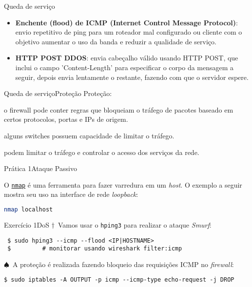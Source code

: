   \begin{frame}{Queda de serviço}
    \begin{itemize}[<+->]
    \item {\bf Enchente (flood) de ICMP (Internet Control Message
        Protocol)}: envio repetitivo de ping para um roteador mal
      configurado ou cliente com o objetivo aumentar o uso da banda e
      reduzir a qualidade de serviço.
    \item {\bf HTTP POST DDOS}: envia cabeçalho válido usando HTTP
      POST, que inclui o campo 'Content-Length' para especificar o
      corpo da mensagem a seguir, depois envia lentamente o restante,
      fazendo com que o servidor espere.
    \end{itemize}    
  \end{frame}

  \begin{frame}{Queda de serviço}{Proteção}
    Proteção:\\
    \begin{description}[<+->]
    \item[Firewall:] o firewall pode conter regras que bloqueiam o tráfego
      de pacotes baseado em certos protocolos, portas e IPs de origem.
    \item[Switch:] alguns switches possuem capacidade de limitar o tráfego.
    \item[Roteador:] podem limitar o tráfego e controlar o acesso dos
      serviços da rede.
    \end{description}
  \end{frame}

\begin{frame}[fragile]{Prática 1}{Ataque Passivo}
  
  O \href{https://nmap.org/}{\tt nmap} é uma ferramenta para fazer varredura em
  um {\it host\/}. O exemplo a seguir mostra seu uso na interface de rede
  {\it loopback\/}:
  
\begin{lstlisting}[language=bash]
nmap localhost
\end{lstlisting}
  
\end{frame}

\begin{frame}[fragile]{Exercício 1}{DoS}
  {\color{red}$\dagger$~Vamos usar o {\tt hping3} para realizar o ataque {\em Smurf}:}
 \begin{verbatim}
 $ sudo hping3 --icmp --flood <IP|HOSTNAME> 
 $         # monitorar usando wireshark filter:icmp
 \end{verbatim}

  \bigskip\pause

{\color{blue}$\spadesuit$~A proteção é realizada fazendo bloqueio das requisições ICMP no {\em firewall}:}
\begin{verbatim}
$ sudo iptables -A OUTPUT -p icmp --icmp-type echo-request -j DROP
\end{verbatim}
  \end{frame}

